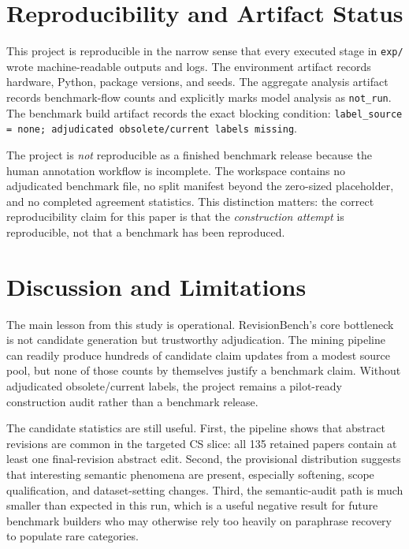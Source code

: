 \documentclass{article}
\begin{document}
\section{Reproducibility and Artifact Status}
\label{sec:repro}

This project is reproducible in the narrow sense that every executed stage in \texttt{exp/} wrote machine-readable outputs and logs. The environment artifact records hardware, Python, package versions, and seeds. The aggregate analysis artifact records benchmark-flow counts and explicitly marks model analysis as \texttt{not\_run}. The benchmark build artifact records the exact blocking condition: \texttt{label\_source = none; adjudicated obsolete/current labels missing}.

The project is \emph{not} reproducible as a finished benchmark release because the human annotation workflow is incomplete. The workspace contains no adjudicated benchmark file, no split manifest beyond the zero-sized placeholder, and no completed agreement statistics. This distinction matters: the correct reproducibility claim for this paper is that the \emph{construction attempt} is reproducible, not that a benchmark has been reproduced.

\section{Discussion and Limitations}
\label{sec:discussion}

The main lesson from this study is operational. RevisionBench's core bottleneck is not candidate generation but trustworthy adjudication. The mining pipeline can readily produce hundreds of candidate claim updates from a modest source pool, but none of those counts by themselves justify a benchmark claim. Without adjudicated obsolete/current labels, the project remains a pilot-ready construction audit rather than a benchmark release.

The candidate statistics are still useful. First, the pipeline shows that abstract revisions are common in the targeted CS slice: all 135 retained papers contain at least one final-revision abstract edit. Second, the provisional distribution suggests that interesting semantic phenomena are present, especially softening, scope qualification, and dataset-setting changes. Third, the semantic-audit path is much smaller than expected in this run, which is a useful negative result for future benchmark builders who may otherwise rely too heavily on paraphrase recovery to populate rare categories.
\end{document}
